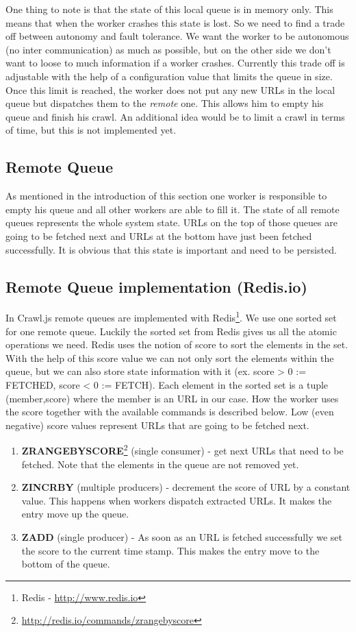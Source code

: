 One thing to note is that the state of this local queue is in memory only. This means that when the worker crashes this state is lost. So we need to find a trade off between autonomy and fault tolerance. We want the worker to be autonomous (no inter communication) as much as possible, but on the other side we don't want to loose to much information if a worker crashes. Currently this trade off is adjustable with the help of a configuration value that limits the queue in size. Once this limit is reached, the worker does not put any new URLs in the local queue but dispatches them to the \emph{remote} one. This allows him to empty his queue and finish his crawl. An additional idea would be to limit a crawl in terms of time, but this is not implemented yet.

\subsection{Remote Queue}
\label{queues_remote}
As mentioned in the introduction of this section one worker is responsible to empty his queue and all other workers are able to fill it. The state of all remote queues represents the whole system state. URLs on the top of those queues are going to be fetched next and URLs at the bottom have just been fetched successfully. It is obvious that this state is important and need to be persisted. 


\subsection{Remote Queue implementation (Redis.io)}
In Crawl.js remote queues are implemented with Redis\footnote{Redis - \url{http://www.redis.io}}. We use one sorted set for one remote queue. Luckily the sorted set from Redis gives us all the atomic operations we need. Redis uses the notion of score to sort the elements in the set. With the help of this score value we can not only sort the elements within the queue, but we can also store state information with it (ex. score > 0 := FETCHED, score < 0 := FETCH). Each element in the sorted set is a tuple (member,score) where the member is an URL in our case. How the worker uses the score together with the available commands is described below. Low (even negative) score values represent URLs that are going to be fetched next.

\begin{enumerate}
  \item \textbf{ZRANGEBYSCORE}\footnote{\url{http://redis.io/commands/zrangebyscore}} (single consumer) - get next URLs that need to be fetched. Note that the elements in the queue are not removed yet.
  \item \textbf{ZINCRBY} (multiple producers) - decrement the score of URL by a constant value. This happens when workers dispatch extracted URLs. It makes the entry move up the queue.
  \item \textbf{ZADD} (single producer) - As soon as an URL is fetched successfully we set the score to the current time stamp. This makes the entry move to the bottom of the queue.
\end{enumerate}

